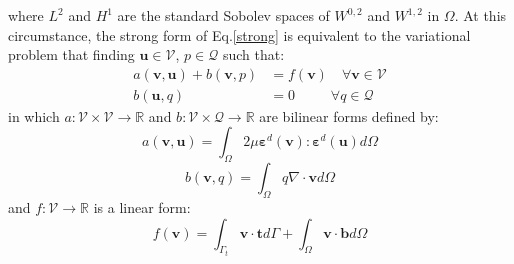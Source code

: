 where $L^2$ and $H^1$ are the standard Sobolev spaces of $W^{0,2}$ and $W^{1,2}$ in $\Omega$. At this circumstance, the strong form of Eq.\eqref{strong} is equivalent to the variational problem that finding $\boldsymbol u \in \mathcal V$, $p \in \mathcal Q$ such that:
\begin{equation}\label{weak}
    \begin{split}
        a(\boldsymbol v, \boldsymbol u) + b(\boldsymbol v, p) &= f(\boldsymbol v)  \quad \forall \boldsymbol v \in \mathcal V \\
        b(\boldsymbol u,q) &= 0 \qquad \;\; \forall q \in \mathcal Q
    \end{split}
\end{equation}
in which $a:\mathcal V \times \mathcal V \rightarrow \mathbb R$ and $b:\mathcal V \times \mathcal Q \rightarrow \mathbb R$ are bilinear forms defined by:
\begin{equation}
a(\boldsymbol v, \boldsymbol u) = \int_{\Omega} 2\mu \boldsymbol \varepsilon^d(\boldsymbol v) : \boldsymbol \varepsilon^d(\boldsymbol u) d\Omega
\end{equation}
\begin{equation}
b(\boldsymbol v, q) = \int_{\Omega} q \nabla \cdot \boldsymbol v d\Omega
\end{equation}
and $f:\mathcal V \rightarrow \mathbb R$ is a linear form:
\begin{equation}
f(\boldsymbol v) = \int_{\Gamma_t} \boldsymbol v \cdot \boldsymbol t d\Gamma + \int_{\Omega} \boldsymbol v \cdot \boldsymbol b d\Omega
\end{equation}

